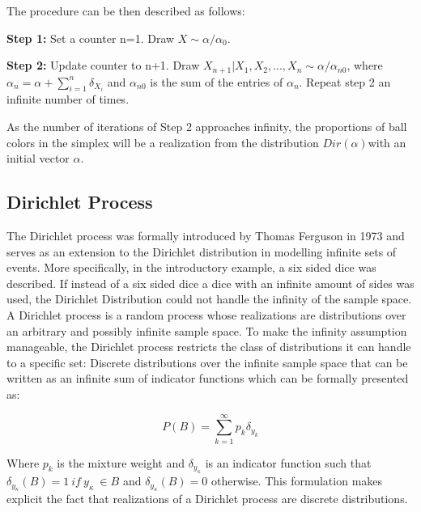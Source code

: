 \documentclass[twoside,hidelinks]{article}
\begin{document}
The procedure can be then described as follows:
\begin{compactitem}

	\item \textbf{Step 1:} Set a counter n=1. Draw $ X \sim \alpha / \alpha_0 $. 
	\item \textbf{Step 2:} Update counter to n+1. Draw $ X_{n+1} | X_1, X_2, ..., X_n \sim \alpha / \alpha_{n0}$, where $\alpha_n = \alpha + \sum_{i=1}^n \delta_{X_i} $ and $ \alpha_{n0}$ is the sum of the entries of $\alpha_n$. Repeat step 2 an infinite number of times.
\end{compactitem}

As the number of iterations of Step 2 approaches infinity, the proportions of ball colors in the simplex will be a realization from the distribution $Dir(\alpha)$with an initial vector $\alpha$.



\subsection{Dirichlet Process}

The Dirichlet process was formally introduced by Thomas Ferguson in 1973 and serves as an extension to the Dirichlet distribution in modelling infinite sets of events. More specifically, in the introductory example, a six sided dice was described. If instead of a six sided dice a dice with an infinite amount of sides was used, the Dirichlet Distribution could not handle the infinity of the sample space. A Dirichlet process is a random process whose realizations are distributions over an arbitrary and possibly infinite sample space. To make the infinity assumption manageable, the Dirichlet process restricts the class of distributions it can handle to a specific set: Discrete distributions over the infinite sample space that can be written as an infinite sum of indicator functions which can be formally presented as:

\begin{equation}
 P( B ) = \sum_{k=1}^\infty p_k \delta_{y_k} 
 \end{equation}

Where $p_k$ is the mixture weight and $\delta_{y_\kappa}$ is an indicator function such that $\delta_{y_\kappa} (B)=1\ if\ y_{\kappa}\ \in B$ and  $\delta_{y_\kappa}(B)=0$ otherwise. This formulation makes explicit the fact that realizations of a Dirichlet process are discrete distributions.
\end{document}
